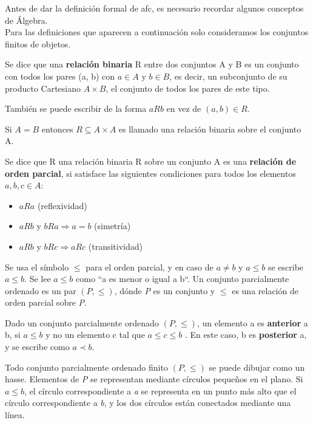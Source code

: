 \documentclass[../../main.tex]{subfiles}
\begin{document}
Antes de dar la definición formal de \gls{afc}, es necesario recordar algunos conceptos de Álgebra.  \\

Para las definiciones que aparecen a continuación solo consideramos los conjuntos finitos de objetos.

\begin{definicion}
Se dice que una \textbf{relación binaria} R entre dos conjuntos A y B es un conjunto con todos los pares (a, b) con $a \in A$ y $b \in B$, es decir, un subconjunto de su producto Cartesiano $A \times B$, el conjunto de todos los pares de este tipo.
\end{definicion}

También se puede escribir de la forma $aRb$ en vez de $(a,b) \in R$. 

Si $A = B$ entonces $R \subseteq A \times A$ es llamado una relación binaria sobre el conjunto A.


\begin{definicion}
Se dice que R una relación binaria R sobre un conjunto A es una \textbf{relación de orden parcial}, si satisface las siguientes condiciones para todos los elementos $a,b,c \in A$:
\begin{itemize}
    \item $aRa$ (reflexividad)
    \item $aRb$ y $bRa \Longrightarrow a = b$ (simetría)
    \item $aRb$ y $bRc \Longrightarrow aRc$ (transitividad)
\end{itemize}
\end{definicion}

Se usa el símbolo $\leq$ para el orden parcial, y en caso de $a \neq b$ y $a \leq b$ se escribe $a \leq b$. Se lee $a \leq b$ como ``a es menor o igual a b``. 
Un conjunto parcialmente ordenado es un par $(P, \leq)$, dónde \textit{P} es un conjunto y $\leq$ es una relación de orden parcial sobre \textit{P}.


\begin{definicion}
Dado un conjunto parcialmente ordenado $(P,\leq)$, un elemento a es \textbf{anterior} a b, si $a \leq b$ y no un elemento c tal que $a \leq c \leq b$ . En este caso, b es \textbf{posterior} a, y se escribe como $a \prec b$.
\end{definicion}

Todo conjunto parcialmente ordenado finito $(P,\leq)$ se puede dibujar como un \gls{hasse}. 
Elementos de \textit{P} se representan mediante círculos pequeños en el plano. Si $a \leq b$, el círculo correspondiente a \textit{a} se representa en un punto más alto que el círculo correspondiente a \textit{b}, y los dos círculos están conectados mediante una línea. 
\end{document}
